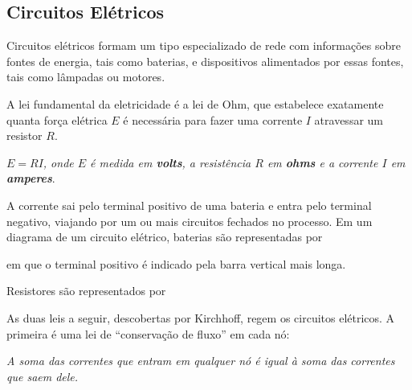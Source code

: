 \subsection{Circuitos Elétricos}

Circuitos elétricos formam um tipo especializado de rede com informações sobre fontes de energia, tais como baterias, e dispositivos alimentados por essas fontes, tais como lâmpadas ou motores.

A lei fundamental da eletricidade é a \textrm{lei de Ohm}, que estabelece exatamente quanta força elétrica $E$ é necessária para fazer uma corrente $I$ atravessar um resistor $R$.

\begin{tcolorbox}[colback=green!30, colframe=green!80!blue, title=Lei de Ohm]
    \textit{$E = RI$, onde $E$ é medida em \textbf{volts}, a resistência $R$ em \textbf{ohms} e a corrente $I$ em \textbf{amperes}}.
\end{tcolorbox}

A corrente sai pelo terminal positivo de uma bateria e entra pelo terminal negativo, viajando por um ou mais circuitos fechados no processo. Em um diagrama de um circuito elétrico, baterias são representadas por
\begin{center}
\end{center}
em que o terminal positivo é indicado pela barra vertical mais longa.

Resistores são representados por
\begin{center}
\end{center}

As duas leis a seguir, descobertas por Kirchhoff, regem os circuitos elétricos. A primeira é uma lei de ``conservação de fluxo'' em cada nó:

\begin{tcolorbox}[colback=green!30, colframe=green!80!blue, title=Lei da Corrente (nós)]
    \textit{A soma das correntes que entram em qualquer nó é igual à soma das correntes que saem dele.}
\end{tcolorbox}


